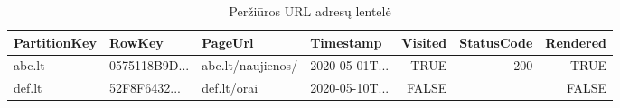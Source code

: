\noindent \hspace*{4em}%
\begin{table}[ht]
  \centering
  \caption{Peržiūros URL adresų lentelė}
    \begin{tabular}{|l|l|l|l|r|r|r|}
    \hline
    PartitionKey & RowKey & PageUrl & Timestamp & \multicolumn{1}{l|}{Visited} & \multicolumn{1}{l|}{StatusCode} & \multicolumn{1}{l|}{Rendered} \bigstrut\\
    \hline
    abc.lt & 0575118B9D... & abc.lt/naujienos/ & 2020-05-01T...& TRUE & 200 & TRUE \bigstrut\\
    \hline
    def.lt & 52F8F6432... & def.lt/orai & 2020-05-10T... & FALSE &     & FALSE \bigstrut\\
    \hline
    \end{tabular}%
  \label{tab:crawling_tablel}%
\end{table}%
